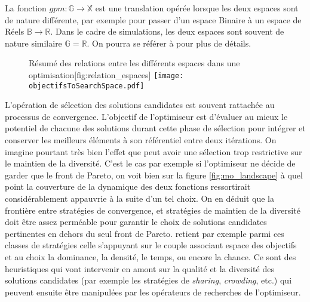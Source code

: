 La fonction $gpm : \mathbb{G} \to \mathbb{X}$ est une translation opérée lorsque les deux espaces sont de nature différente, par exemple pour passer d'un espace Binaire à un espace de Réels $\mathbb{B} \to \mathbb{R}$. Dans le cadre de simulations, les deux espaces sont souvent de nature similaire $\mathbb{G} = \mathbb{R}$. On pourra se référer à \textcite[86-88]{Weise2011} pour plus de détails.

\begin{figure}[!htbp]
	\begin{sidecaption}{Résumé des relations entre les différents espaces dans une optimisation}[fig:relation_espaces]
		\centering
		\texttt{[image: objectifsToSearchSpace.pdf]}
  \end{sidecaption}
\end{figure}


L'opération de sélection des solutions candidates est souvent rattachée au processus de convergence. L'objectif de l'optimiseur est d'évaluer au mieux le potentiel de chacune des solutions durant cette phase de sélection pour intégrer et conserver les meilleurs éléments à son référentiel entre deux itérations. On imagine pourtant très bien l'effet que peut avoir une sélection trop restrictive sur le maintien de la diversité. C'est le cas par exemple si l'optimiseur ne décide de garder que le front de Pareto, on voit bien sur la figure \ref{fig:mo_landscape} à quel point la couverture de la dynamique des deux fonctions ressortirait considérablement appauvrie à la suite d'un tel choix. On en déduit que la frontière entre stratégies de convergence, et stratégies de maintien de la diversité doit être assez perméable pour garantir le choix de solutions candidates pertinentes en dehors du seul front de Pareto. \textcite{Zitzler1999a} retient par exemple parmi ces classes de stratégies celle s'appuyant sur le couple associant espace des objectifs et au choix la dominance, la densité, le temps, ou encore la chance. Ce sont des heuristiques qui vont intervenir en amont sur la qualité et la diversité des solutions candidates (par exemple les stratégies de \textit{sharing}, \textit{crowding}, etc.) qui peuvent ensuite être manipulées par les opérateurs de recherches de l'optimiseur.

